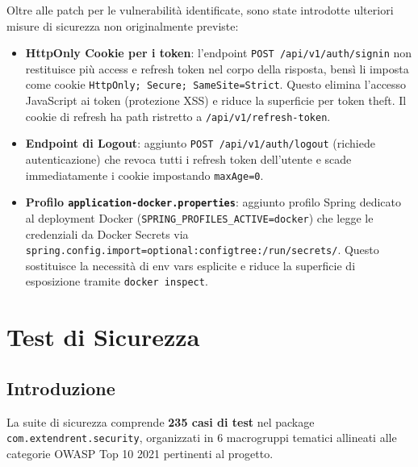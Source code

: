 \documentclass[12pt, a4paper]{article}
\begin{document}
    Oltre alle patch per le vulnerabilità identificate, sono state introdotte ulteriori
    misure di sicurezza non originalmente previste:

    \begin{itemize}
        \item \textbf{HttpOnly Cookie per i token}: l'endpoint \texttt{POST /api/v1/auth/signin}
        non restituisce più access e refresh token nel corpo della risposta, bensì li imposta
        come cookie \texttt{HttpOnly; Secure; SameSite=Strict}. Questo elimina l'accesso
        JavaScript ai token (protezione XSS) e riduce la superficie per token theft.
        Il cookie di refresh ha path ristretto a \texttt{/api/v1/refresh-token}.

        \item \textbf{Endpoint di Logout}: aggiunto \texttt{POST /api/v1/auth/logout}
        (richiede autenticazione) che revoca tutti i refresh token dell'utente e scade
        immediatamente i cookie impostando \texttt{maxAge=0}.

        \item \textbf{Profilo \texttt{application-docker.properties}}: aggiunto profilo Spring
        dedicato al deployment Docker (\texttt{SPRING\_PROFILES\_ACTIVE=docker}) che legge le
        credenziali da Docker Secrets via \texttt{spring.config.import=optional:configtree:/run/secrets/}.
        Questo sostituisce la necessità di env vars esplicite e riduce la superficie di
        esposizione tramite \texttt{docker inspect}.
    \end{itemize}


    \section{Test di Sicurezza}
    \label{sec:security_testing}

    \subsection{Introduzione}
    \label{subsec:security_intro}

    La suite di sicurezza comprende \textbf{235 casi di test} nel package
    \texttt{com.extendrent.security}, organizzati in 6 macrogruppi tematici
    allineati alle categorie OWASP Top 10 2021 pertinenti al progetto.
\end{document}
